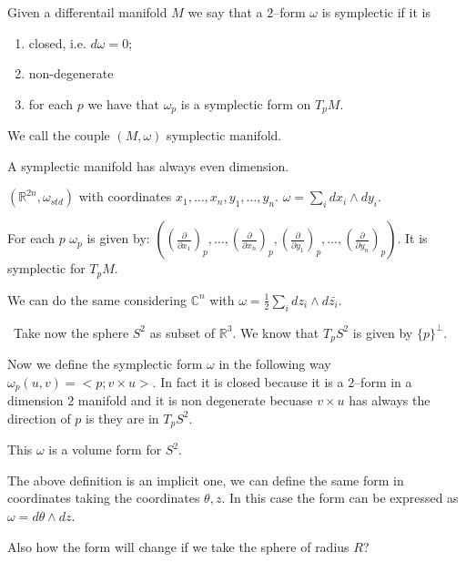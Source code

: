 \begin{Dfn}
    Given a differentail manifold $M$ we say that a $2$--form $\omega$ is symplectic if it is
    \begin{enumerate}[label=\DfnLbl]

        \item closed, i.e. $d\omega=0$;

        \item non-degenerate 

        \item for each $p$ we have that $\omega_p$ is a symplectic form on $T_pM$.
    \end{enumerate}

    We call the couple $(M,\omega)$ symplectic manifold.
\end{Dfn}

\begin{Prp}
    A symplectic manifold has always even dimension.
\end{Prp}

\begin{Exp}
    $(\mathbb{R}^{2n},\omega_{std})$ with coordinates $x_1,\dots,x_n,y_1,\dots,y_n$. $\omega=\sum_i dx_i \wedge dy_i$.

    For each $p$ $\omega_p$ is given by: $\left( (\frac{\partial}{\partial x_1})_p, \dots, (\frac{\partial}{\partial x_n})_p, (\frac{\partial}{\partial y_1})_p, \dots, (\frac{\partial}{\partial y_n})_p\right)$. It is symplectic for $T_pM$.

    We can do the same considering $\mathbb{C}^n$ with $\omega=\frac{1}{2} \sum_i dz_i \wedge d\bar{z_i}$.
\end{Exp}

\begin{Exp}\
    Take now the sphere $S^2$ as subset of $\mathbb{R}^3$. We know that $T_pS^2$ is given by $\{p\}^\perp$.

    Now we define the symplectic form $\omega$ in the following way $\omega_p(u,v)=<p; v \times u>$. In fact it is closed because it is a $2$--form in a dimension $2$ manifold and it is non degenerate becuase $v \times u$ has always the direction of $p$ is they are in $T_pS^2$.\

    This $\omega$ is a volume form for $S^2$.
\end{Exp}

\begin{Exc}
    The above definition is an implicit one, we can define the same form in coordinates taking the coordinates $\theta, z$. In this case the form can be expressed as $\omega= d\theta \wedge dz$.

    Also how the form will change if we take the sphere of radius $R$?
\end{Exc}

